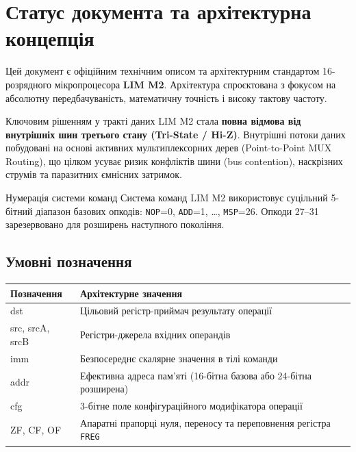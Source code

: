 \documentclass[11pt,a4paper]{article}
\newcommand{\reg}[1]{\texttt{#1}}
\begin{document}
\tableofcontents
\clearpage

\section{Статус документа та архітектурна концепція}
Цей документ є офіційним технічним описом та архітектурним стандартом 16-розрядного мікропроцесора \textbf{LIM M2}. Архітектура спроєктована з фокусом на абсолютну передбачуваність, математичну точність і високу тактову частоту.

Ключовим рішенням у тракті даних LIM M2 стала \textbf{повна відмова від внутрішніх шин третього стану (Tri-State / Hi-Z)}. Внутрішні потоки даних побудовані на основі активних мультиплексорних дерев (Point-to-Point MUX Routing), що цілком усуває ризик конфліктів шини (bus contention), наскрізних струмів та паразитних ємнісних затримок.

\begin{limnote}{Нумерація системи команд}
Система команд LIM M2 використовує суцільний 5-бітний діапазон базових опкодів: 
\texttt{NOP}=0, \texttt{ADD}=1, \ldots, \texttt{MSP}=26. Опкоди 27--31 зарезервовано для розширень наступного покоління.
\end{limnote}

\subsection{Умовні позначення}
\begin{tabularx}{\textwidth}{>{\ttfamily}p{28mm}X}
\toprule
Позначення & Архітектурне значення \\
\midrule
dst & Цільовий регістр-приймач результату операції \\
src, srcA, srcB & Регістри-джерела вхідних операндів \\
imm & Безпосереднє скалярне значення в тілі команди \\
addr & Ефективна адреса пам'яті (16-бітна базова або 24-бітна розширена) \\
cfg & 3-бітне поле конфігураційного модифікатора операції \\
ZF, CF, OF & Апаратні прапорці нуля, переносу та переповнення регістра \reg{FREG} \\
\bottomrule
\end{tabularx}
\end{document}
